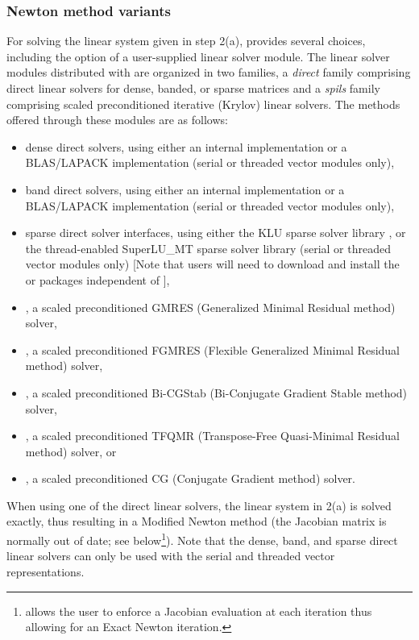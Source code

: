 
\subsubsection*{Newton method variants}
For solving the linear system given in step 2(a), {\kinsol} provides
several choices, including the option of a user-supplied
linear solver module. The linear solver modules distributed with {\sundials}
are organized in two families, a {\em direct} family comprising direct linear 
solvers for dense, banded, or sparse matrices and a {\em spils} 
family comprising scaled preconditioned
iterative (Krylov) linear solvers. 
The methods offered through these modules are as follows:
\begin{itemize}
\item dense direct solvers, using either an internal implementation or 
  a BLAS/LAPACK implementation (serial or threaded vector modules only),
\item band direct solvers, using either an internal implementation or 
  a BLAS/LAPACK implementation (serial or threaded vector modules only),
\item sparse direct solver interfaces, using either the KLU sparse solver
  library \cite{DaPa:10,KLU_site}, or the thread-enabled SuperLU\_MT sparse
  solver library \cite{Li:05,DGL:99,SuperLUMT_site} (serial or threaded 
  vector modules only) [Note that users will need to download and install the 
  {\klu} or {\superlumt} packages independent of {\kinsol}],
\item {\spgmr}, a scaled preconditioned GMRES (Generalized Minimal Residual method)
  solver,
\item {\spfgmr}, a scaled preconditioned FGMRES (Flexible Generalized 
  Minimal Residual method) solver,
\item {\spbcg}, a scaled preconditioned Bi-CGStab (Bi-Conjugate Gradient Stable
  method) solver, 
\item {\sptfqmr}, a scaled preconditioned TFQMR (Transpose-Free Quasi-Minimal
  Residual method) solver, or
\item {\pcg}, a scaled preconditioned CG (Conjugate Gradient method) solver.
\end{itemize}
When using one of the direct linear solvers, the linear system in 2(a) is 
solved exactly, thus resulting in a Modified Newton method (the Jacobian matrix 
is normally out of date; see below\footnote{{\kinsol} allows the user to enforce 
a Jacobian evaluation at each iteration thus allowing for an Exact Newton iteration.}). 
Note that the dense, band, and sparse direct linear solvers can only
be used with the serial and threaded vector representations.

